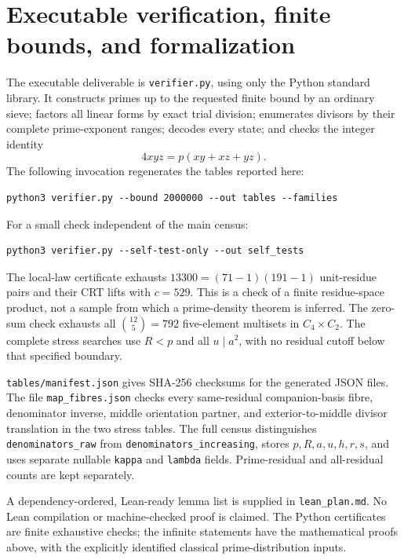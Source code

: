 \documentclass[11pt]{article}
\theoremstyle{remark}\newtheorem{remark}[theorem]{Remark}
\begin{document}
\section{Executable verification, finite bounds, and formalization}
The executable deliverable is \texttt{verifier.py}, using only the Python standard library. It constructs primes up to the requested finite bound by an ordinary sieve; factors all linear forms by exact trial division; enumerates divisors by their complete prime-exponent ranges; decodes every state; and checks the integer identity
\[
 4xyz=p(xy+xz+yz).
\]
The following invocation regenerates the tables reported here:
\begin{Verbatim}[fontsize=\small]
python3 verifier.py --bound 2000000 --out tables --families
\end{Verbatim}
For a small check independent of the main census:
\begin{Verbatim}[fontsize=\small]
python3 verifier.py --self-test-only --out self_tests
\end{Verbatim}
The local-law certificate exhausts $13300=(71-1)(191-1)$ unit-residue pairs and their CRT lifts with $c=529$. This is a check of a finite residue-space product, not a sample from which a prime-density theorem is inferred. The zero-sum check exhausts all $\binom{12}{5}=792$ five-element multisets in $C_4\times C_2$. The complete stress searches use $R<p$ and all $u\mid a^2$, with no residual cutoff below that specified boundary.

\texttt{tables/manifest.json} gives SHA-256 checksums for the generated JSON files. The file \texttt{map\_fibres.json} checks every same-residual companion-basis fibre, denominator inverse, middle orientation partner, and exterior-to-middle divisor translation in the two stress tables. The full census distinguishes \texttt{denominators\_raw} from \texttt{denominators\_increasing}, stores $p,R,a,u,h,r,s$, and uses separate nullable \texttt{kappa} and \texttt{lambda} fields. Prime-residual and all-residual counts are kept separately.

A dependency-ordered, Lean-ready lemma list is supplied in \texttt{lean\_plan.md}. No Lean compilation or machine-checked proof is claimed. The Python certificates are finite exhaustive checks; the infinite statements have the mathematical proofs above, with the explicitly identified classical prime-distribution inputs.
\end{document}
